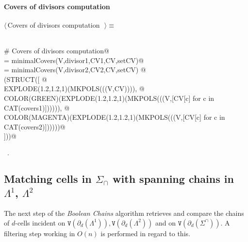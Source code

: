 \documentclass[11pt,oneside]{article}	%
\begin{document}
\paragraph{Covers of divisors computation}
\begin{flushleft} \small \label{scrap20}
$\langle\,$Covers of divisors computation\nobreak\ {\footnotesize {}}$\,\rangle\equiv$
\vspace{-1ex}
\begin{list}{}{} \item
\mbox{}\verb@@\\
\mbox{}\verb@# Covers of divisors computation@\\
\mbox{} = minimalCovers(V,divisor1,CV1,CV,setCV)@\\
\mbox{} = minimalCovers(V,divisor2,CV2,CV,setCV)   @\\
\mbox{}\verb@VIEW(STRUCT([ @\\
\mbox{}\verb@   EXPLODE(1.2,1.2,1)(MKPOLS(((V,CV)))), @\\
\mbox{}\verb@   COLOR(GREEN)(EXPLODE(1.2,1.2,1)(MKPOLS(((V,[CV[c] for c in CAT(covers1)]))))), @\\
\mbox{}\verb@   COLOR(MAGENTA)(EXPLODE(1.2,1.2,1)(MKPOLS(((V,[CV[c] for c in CAT(covers2)])))))@\\
\mbox{}\verb@    ]))@\\
\mbox{}\verb@@{\NWsep}
\end{list}
\vspace{-1ex}
\footnotesize\addtolength{\baselineskip}{-1ex}
\begin{list}{}{\setlength{\itemsep}{-\parsep}\setlength{\itemindent}{-\leftmargin}}
\item \NWtxtMacroRefIn\ .
\end{list}
\end{flushleft}


\subsection{Matching cells in $\Sigma_\cap$ with spanning chains in $\Lambda^1$, $\Lambda^2$}

The next step of the \emph{Boolean Chains} algorithm retrieves and compare the chains of $d$-cells incident on $\texttt{V}(\partial_d(\Lambda^1)), \texttt{V}(\partial_d(\Lambda^2))$ and on $\texttt{V}(\partial_d(\Sigma^\cap))$. A filtering step working in $O(n)$ is performed in regard to this.
\end{document}
